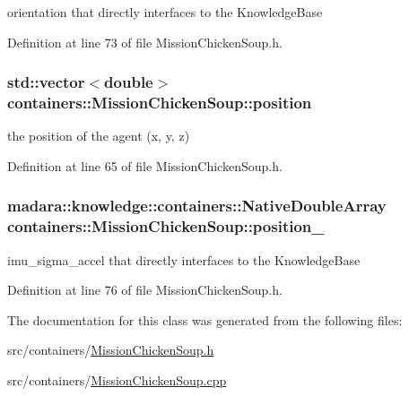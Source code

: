 orientation that directly interfaces to the Knowledge\+Base 



Definition at line 73 of file Mission\+Chicken\+Soup.\+h.

\subsubsection[{\texorpdfstring{position}{position}}]{\setlength{\rightskip}{0pt plus 5cm}std\+::vector$<$double$>$ containers\+::\+Mission\+Chicken\+Soup\+::position}\hypertarget{classcontainers_1_1MissionChickenSoup_ac0c96514382b72a88f7e6f2e5e170082}{}\label{classcontainers_1_1MissionChickenSoup_ac0c96514382b72a88f7e6f2e5e170082}


the position of the agent (x, y, z) 



Definition at line 65 of file Mission\+Chicken\+Soup.\+h.

\subsubsection[{\texorpdfstring{position\+\_\+}{position_}}]{\setlength{\rightskip}{0pt plus 5cm}madara\+::knowledge\+::containers\+::\+Native\+Double\+Array containers\+::\+Mission\+Chicken\+Soup\+::position\+\_\+\hspace{0.3cm}{\ttfamily [private]}}\hypertarget{classcontainers_1_1MissionChickenSoup_afa8ca26939245451a0b5e5c42b05c219}{}\label{classcontainers_1_1MissionChickenSoup_afa8ca26939245451a0b5e5c42b05c219}


imu\+\_\+sigma\+\_\+accel that directly interfaces to the Knowledge\+Base 



Definition at line 76 of file Mission\+Chicken\+Soup.\+h.



The documentation for this class was generated from the following files\+:\begin{DoxyCompactItemize}
\item 
src/containers/\hyperlink{MissionChickenSoup_8h}{Mission\+Chicken\+Soup.\+h}\item 
src/containers/\hyperlink{MissionChickenSoup_8cpp}{Mission\+Chicken\+Soup.\+cpp}\end{DoxyCompactItemize}
